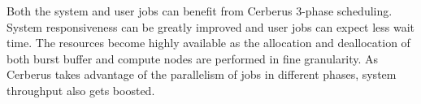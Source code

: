 Both the system and user jobs can benefit from Cerberus 3-phase scheduling.
System responsiveness can be greatly improved and
user jobs can expect less wait time. 
The resources become highly available as the allocation and deallocation of
both burst buffer and compute nodes are performed in fine granularity. 
As Cerberus takes advantage of the parallelism of jobs in different phases,
system throughput also gets boosted.

